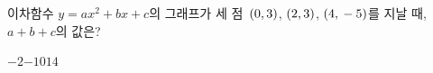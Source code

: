 이차함수 $y=ax^2+bx+c$의 그래프가 세 점~$(0{,}\mkern3mu 3)$, $(2{,}\mkern3mu 3)$, $(4{,}\mkern3mu -5)$를 지날 때, $a+b+c$의 값은? 
\begin{choices32}{$-2$}{$-1$}{$0$}{$1$}{$4$}\end{choices32}
